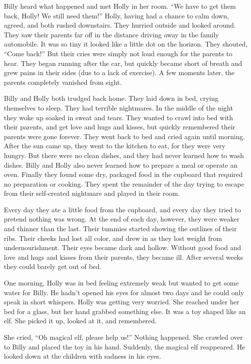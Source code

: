 Billy heard what happened and met Holly in her room. “We have to get them back, Holly! We still need them!” Holly, having had a chance to calm down, agreed, and both rushed downstairs. They hurried outside and looked around. They saw their parents far off in the distance driving away in the family automobile. It was so tiny it looked like a little dot on the horizon. They shouted, “Come back!” But their cries were simply not loud enough for the parents to hear. They began running after the car, but quickly became short of breath and grew pains in their sides (due to a lack of exercise). A few moments later, the parents completely vanished from sight.

Billy and Holly both trudged back home. They laid down in bed, crying themselves to sleep. They had terrible nightmares. In the middle of the night they woke up soaked in sweat and tears. They wanted to crawl into bed with their parents, and get love and hugs and kisses, but quickly remembered their parents were gone forever. They went back to bed and cried again until morning. After the sun came up, they went to the kitchen to eat, for they were very hungry. But there were no clean dishes, and they had never learned how to wash dishes. Billy and Holly also never learned how to prepare a meal or operate an oven. Finally they found some dry, packaged food in the cupboard that required no preparation or cooking. They spent the remainder of the day trying to escape from their self-created nightmare and played in their room.

Every day they ate a little food from the cupboard, and every day they tried to pretend nothing was wrong. At the end of each day, however, they were weaker and thinner than the last. Their tummies started showing the outlines of their ribs. Their cheeks had lost all color, and drew in as they lost weight from undernourishment. Their eyes became dark and hollow. Without good food and love and hugs and kisses from their parents, they became ill. After several weeks they could barely get out of bed.

One morning, Holly was in bed feeling extremely weak but wanted to get some water for Billy. He hadn't opened his eyes for almost two days and he could only speak in short whispers. Holly was getting very worried. She reached under her bed for a glass, but her hand grabbed something else. It was a toy shaped like an elf. She picked it up, looked at it, and remembered.

She cried, “Oh magical elf, please help us!” Nothing happened. She crawled over to Billy and placed the toy in his hand. Suddenly, the magical elf reappeared. He looked down at the children with sadness in his eyes.

